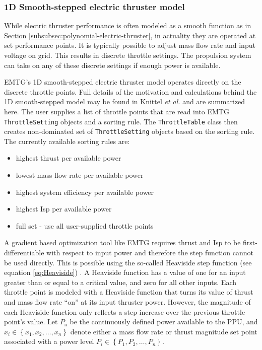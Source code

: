 \subsubsection{1D Smooth-stepped electric thruster model}
\label{subsubsec:smooth-stepped-electric-thruster}

While electric thruster performance is often modeled as a smooth function as in Section \ref{subsubsec:polynomial-electric-thruster}, in actuality they are operated at set performance points. It is typically possible to adjust mass flow rate and input voltage on grid. This results in discrete throttle settings. The propulsion system can take on any of these discrete settings if enough power is available.

\ac{EMTG}'s 1D smooth-stepped electric thruster model operates directly on the discrete throttle points. Full details of the motivation and calculations behind the 1D smooth-stepped model may be found in Knittel \textit{et al.} \cite{Knittel_2Dthrottle} and are summarized here. The user supplies a list of throttle points that are read into \ac{EMTG} \texttt{ThrottleSetting} objects and a sorting rule. The \texttt{ThrottleTable} class then creates non-dominated set of \texttt{ThrottleSetting} objects based on the sorting rule. The currently available sorting rules are:

\begin{itemize}
	\item highest thrust per available power
	\item lowest mass flow rate per available power
	\item highest system efficiency per available power
	\item highest \ac{Isp} per available power
	\item full set - use all user-supplied throttle points	
\end{itemize}

A gradient based optimization tool like \ac{EMTG} requires thrust and \ac{Isp} to be first-differentiable with respect to input power and therefore the step function cannot be used directly. This is possible using the so-called Heaviside step function (see equation \ref{eq:Heaviside}) \cite{EMTG_OperationalConstraints}. A Heaviside function has a value of one for an input greater than or equal to a critical value, and zero for all other inputs. Each throttle point is modeled with a Heaviside function that turns its value of thrust and mass flow rate ``on'' at its input thruster power. However, the magnitude of each Heaviside function only reflects a step increase over the previous throttle point's value. Let $P_\textrm{a}$ be the continuously defined power available to the PPU, and $x_i \in \left\{x_1,x_2,\dots,x_n\right\}$ denote either a mass flow rate or thrust magnitude set point associated with a power level $P_i\in\left\{P_1,P_2,\dots,P_n\right\}$.  

